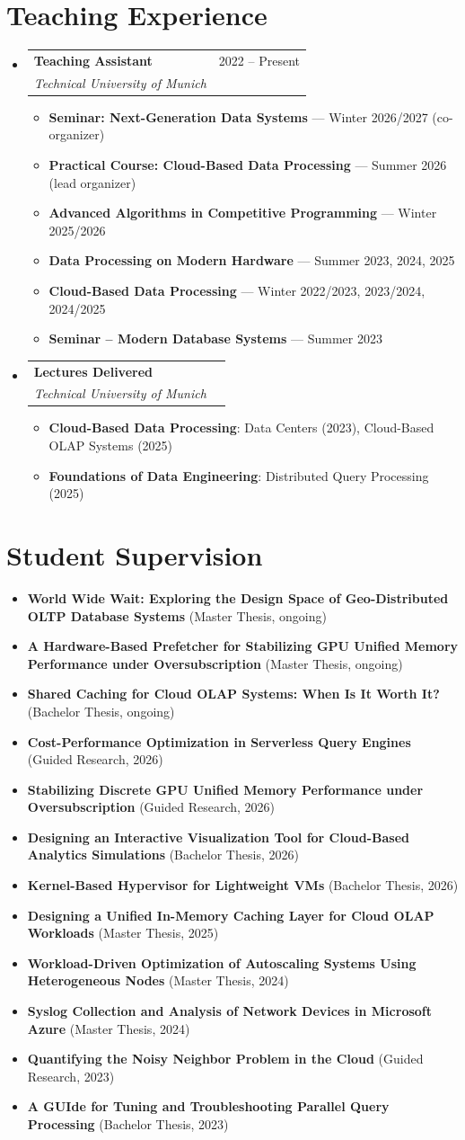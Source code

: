 \documentclass[letterpaper,11pt]{article}
\makeatletter
\newcommand{\resumeItem}[1]{
  \item\small{
    {#1 \vspace{-2pt}}
  }
}
\newcommand{\resumeSubheading}[4]{
  \vspace{-2pt}\item
    \begin{tabular*}{0.97\textwidth}[t]{l@{\extracolsep{\fill}}r}
      \textbf{#1} & #2 \\
      \textit{\small#3} & \textit{\small #4} \\
    \end{tabular*}\vspace{-7pt}
}
\newcommand{\resumeSubHeadingListStart}{\begin{itemize}[leftmargin=0.15in, label={}]}
\newcommand{\resumeSubHeadingListEnd}{\end{itemize}}
\newcommand{\resumeItemListStart}{\begin{itemize}}
\newcommand{\resumeItemListEnd}{\end{itemize}\vspace{-5pt}}
\makeatother
\begin{document}
\section{Teaching Experience}
\resumeSubHeadingListStart
\resumeSubheading
{Teaching Assistant}{2022 -- Present}
{Technical University of Munich}{}
\resumeItemListStart
\resumeItem{\textbf{Seminar: Next-Generation Data Systems} — Winter 2026/2027 (co-organizer)}
\resumeItem{\textbf{Practical Course: Cloud-Based Data Processing} — Summer 2026 (lead organizer)}
\resumeItem{\textbf{Advanced Algorithms in Competitive Programming} — Winter 2025/2026}
\resumeItem{\textbf{Data Processing on Modern Hardware} — Summer 2023, 2024, 2025}
\resumeItem{\textbf{Cloud-Based Data Processing} — Winter 2022/2023, 2023/2024, 2024/2025}
\resumeItem{\textbf{Seminar – Modern Database Systems} — Summer 2023}
\resumeItemListEnd
\resumeSubheading
{Lectures Delivered}{}
{Technical University of Munich}{}
\resumeItemListStart
\resumeItem{\textbf{Cloud-Based Data Processing}: Data Centers (2023), Cloud-Based OLAP Systems (2025)}
\resumeItem{\textbf{Foundations of Data Engineering}: Distributed Query Processing (2025)}
\resumeItemListEnd
\resumeSubHeadingListEnd
\section{Student Supervision}
\resumeItemListStart
\resumeItem{\textbf{World Wide Wait: Exploring the Design Space of Geo-Distributed OLTP Database Systems} (Master Thesis, ongoing)}
\resumeItem{\textbf{A Hardware-Based Prefetcher for Stabilizing GPU Unified Memory Performance under Oversubscription} (Master Thesis, ongoing)}
\resumeItem{\textbf{Shared Caching for Cloud OLAP Systems: When Is It Worth It?} (Bachelor Thesis, ongoing)}
\resumeItem{\textbf{Cost-Performance Optimization in Serverless Query Engines} (Guided Research, 2026)}
\resumeItem{\textbf{Stabilizing Discrete GPU Unified Memory Performance under Oversubscription} (Guided Research, 2026)}
\resumeItem{\textbf{Designing an Interactive Visualization Tool for Cloud-Based Analytics Simulations} (Bachelor Thesis, 2026)}
\resumeItem{\textbf{Kernel-Based Hypervisor for Lightweight VMs} (Bachelor Thesis, 2026)}
\resumeItem{\textbf{Designing a Unified In-Memory Caching Layer for Cloud OLAP Workloads} (Master Thesis, 2025)}
\resumeItem{\textbf{Workload-Driven Optimization of Autoscaling Systems Using Heterogeneous Nodes} (Master Thesis, 2024)}
\resumeItem{\textbf{Syslog Collection and Analysis of Network Devices in Microsoft Azure} (Master Thesis, 2024)}
\resumeItem{\textbf{Quantifying the Noisy Neighbor Problem in the Cloud} (Guided Research, 2023)}
\resumeItem{\textbf{A GUIde for Tuning and Troubleshooting Parallel Query Processing} (Bachelor Thesis, 2023)}
\resumeItemListEnd
\end{document}
